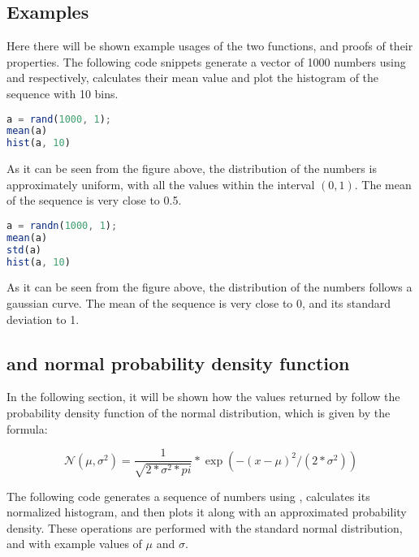 \subsection{Examples}
Here there will be shown example usages of the two functions, and proofs of their properties.
The following code snippets generate a vector of 1000 numbers using  and  respectively, calculates their mean value and plot the histogram of the sequence with 10 bins.

\begin{lstlisting}[language=Octave]
a = rand(1000, 1);
mean(a)
hist(a, 10)
\end{lstlisting}

As it can be seen from the figure above, the distribution of the numbers is approximately uniform, with all the values within the interval $ (0, 1) $.
The mean of the sequence is very close to 0.5.

\begin{lstlisting}[language=Octave]
a = randn(1000, 1);
mean(a)
std(a)
hist(a, 10)
\end{lstlisting}

As it can be seen from the figure above, the distribution of the numbers follows a gaussian curve.
The mean of the sequence is very close to 0, and its standard deviation to 1.


\subsection{ and normal probability density function}
In the following section, it will be shown how the values returned by  follow the probability density function of the normal distribution, which is given by the formula:

\begin{equation}
	\mathcal{N}(\mu, \sigma^2) = \frac{1}{\sqrt{2*\sigma^2*pi}} * \exp(-(x-\mu)^2 / (2*\sigma^2))
\end{equation}

The following code generates a sequence of numbers using , calculates its normalized histogram, and then plots it along with an approximated probability density.
These operations are performed with the standard normal distribution, and with example values of $\mu$ and $\sigma$.


